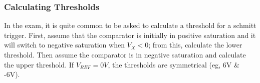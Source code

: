\documentclass[a4paper,11pt, twocolumn]{article}
\begin{document}
\subsubsection{Calculating Thresholds}
In the exam, it is quite common to be asked to calculate a threshold for a schmitt trigger. First, assume that the comparator is initially in positive saturation and it will switch to negative saturation when $V_X < 0$; from this, calculate the lower threshold. Then assume the comparator is in negative saturation and calculate the upper threshold. If $V_{REF} = 0V$, the thresholds are symmetrical (eg, 6V \& -6V).
\end{document}
